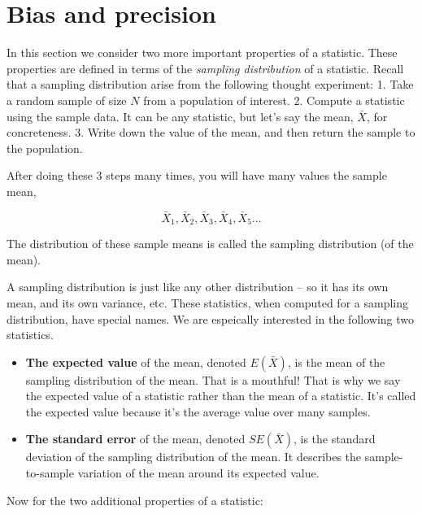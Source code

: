 \documentclass[
  letterpaper,
  DIV=11,
  numbers=noendperiod]{scrreprt}
\begin{document}
\hypertarget{bias-and-precision}{%
\section{Bias and precision}\label{bias-and-precision}}

In this section we consider two more important properties of a
statistic. These properties are defined in terms of the \emph{sampling
distribution} of a statistic. Recall that a sampling distribution arise
from the following thought experiment: 1. Take a random sample of size
\(N\) from a population of interest. 2. Compute a statistic using the
sample data. It can be any statistic, but let's say the mean,
\(\bar X\), for concreteness. 3. Write down the value of the mean, and
then return the sample to the population.

After doing these 3 steps many times, you will have many values the
sample mean,

\[ \bar{X}_1, \bar{X}_2, \bar{X}_3, \bar{X}_4, \bar{X}_5 ... \]

The distribution of these sample means is called the sampling
distribution (of the mean).

A sampling distribution is just like any other distribution -- so it has
its own mean, and its own variance, etc. These statistics, when computed
for a sampling distribution, have special names. We are espeically
interested in the following two statistics.

\begin{itemize}
\item
  \textbf{The expected value} of the mean, denoted \(E(\bar X)\), is the
  mean of the sampling distribution of the mean. That is a mouthful!
  That is why we say the expected value of a statistic rather than the
  mean of a statistic. It's called the expected value because it's the
  average value over many samples.
\item
  \textbf{The standard error} of the mean, denoted \(SE(\bar X)\), is
  the standard deviation of the sampling distribution of the mean. It
  describes the sample-to-sample variation of the mean around its
  expected value.
\end{itemize}

Now for the two additional properties of a statistic:
\end{document}
